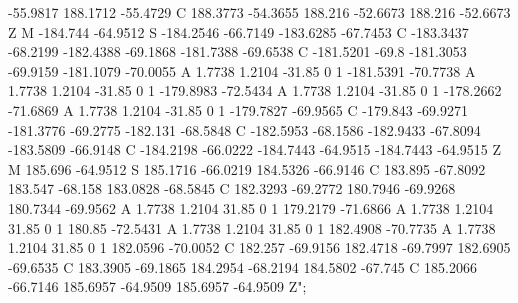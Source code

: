 {{{-55.9817 188.1712 -55.4729 C 188.3773 -54.3655 188.216 -52.6673 188.216 -52.6673 Z M -184.744 -64.9512 S -184.2546 -66.7149 -183.6285 -67.7453 C -183.3437 -68.2199 -182.4388 -69.1868 -181.7388 -69.6538 C -181.5201 -69.8 -181.3053 -69.9159 -181.1079 -70.0055 A 1.7738 1.2104 -31.85 0 1 -181.5391 -70.7738 A 1.7738 1.2104 -31.85 0 1 -179.8983 -72.5434 A 1.7738 1.2104 -31.85 0 1 -178.2662 -71.6869 A 1.7738 1.2104 -31.85 0 1 -179.7827 -69.9565 C -179.843 -69.9271 -181.3776 -69.2775 -182.131 -68.5848 C -182.5953 -68.1586 -182.9433 -67.8094 -183.5809 -66.9148 C -184.2198 -66.0222 -184.7443 -64.9515 -184.7443 -64.9515 Z M 185.696 -64.9512 S 185.1716 -66.0219 184.5326 -66.9146 C 183.895 -67.8092 183.547 -68.158 183.0828 -68.5845 C 182.3293 -69.2772 180.7946 -69.9268 180.7344 -69.9562 A 1.7738 1.2104 31.85 0 1 179.2179 -71.6866 A 1.7738 1.2104 31.85 0 1 180.85 -72.5431 A 1.7738 1.2104 31.85 0 1 182.4908 -70.7735 A 1.7738 1.2104 31.85 0 1 182.0596 -70.0052 C 182.257 -69.9156 182.4718 -69.7997 182.6905 -69.6535 C 183.3905 -69.1865 184.2954 -68.2194 184.5802 -67.745 C 185.2066 -66.7146 185.6957 -64.9509 185.6957 -64.9509 Z";
        } 
    } 
}

\def\makecover{%
    \thispagestyle{empty}
    \begin{tikzpicture}[remember picture,overlay]
        \node (bg) [shape=rectangle, fill=\coverbg, minimum height=\paperheight, minimum width=\paperwidth, anchor=south west] at (current page.south west) {};
        \node [frontispiece, minimum width=300mm, minimum height=400mm] at ([yshift=65mm]bg.south) {};
        \node [text=\coverfg] at ([yshift=30mm]bg.south) {%
            \begin{tabular}{cc}
                Ano \journalyearn, nº \journalnumber \\
                \journalsemester{} \journalyear \\
                \textsc{issn} \journalISSN{}
            \end{tabular}
        };
        \node (galo) [text=\coverfg, scale=4] at ([yshift=-50mm, xshift=70mm]bg.north west) {\Huge GALO};
        \node [text=\coverfg, scale=1.75] at ([xshift=32mm]galo.north west) {Revista};
        \node [text=\coverfg, align=left, scale=1.75] at ([xshift=15mm]galo.east) {Arte,\\Sociedade\\\& Cultura};
        \node (title) [text=\coverfg] at ([yshift=25mm]bg.center) {\Huge\covertitle};
        \node [text=\coverfg] at ([yshift=5mm]title.north) {\large\coverpretitle};
        \node [text=\coverfg] at ([yshift=-5mm]title.south) {\Large{\expandafter\makefirstuc\expandafter{\coversubtitle}}};
    \end{tikzpicture}
    \cleardoublepage
}

